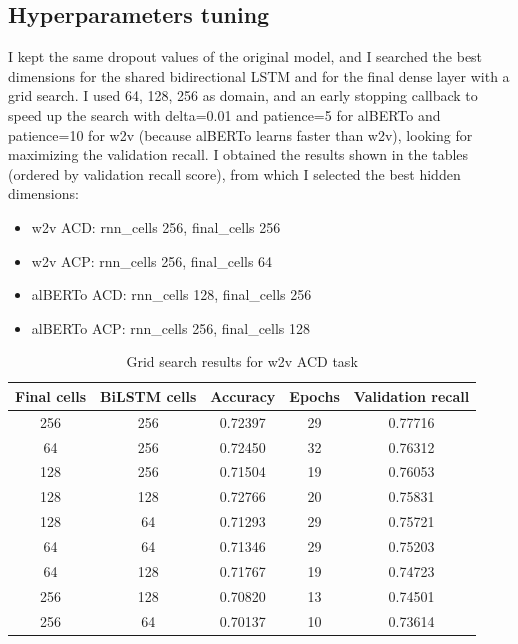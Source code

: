 \documentclass{article}
\begin{document}
        \subsection{Hyperparameters tuning}\label{subsec:hyperparameters-tuning}
            I kept the same dropout values of the original model, and I searched the best dimensions for the shared bidirectional LSTM and for the final dense layer with a grid search.
            I used {64, 128, 256} as domain, and an early stopping callback to speed up the search with delta=0.01 and patience=5 for alBERTo and patience=10 for w2v (because alBERTo learns faster than w2v), looking for maximizing the validation recall.
            I obtained the results shown in the tables (ordered by validation recall score), from which I selected the best hidden dimensions:
            \begin{itemize}
                \item w2v ACD: rnn\_cells 256, final\_cells 256
                \item w2v ACP: rnn\_cells 256, final\_cells 64
                \item alBERTo ACD: rnn\_cells 128, final\_cells 256
                \item alBERTo ACP: rnn\_cells 256, final\_cells 128
            \end{itemize}
                \begin{table}[h!]
                \begin{center}
                \caption{Grid search results for w2v ACD task}
                \label{tab:table6}
                \begin{tabular}{c|c|c|c|c}
                    \textbf{Final cells} & \textbf{BiLSTM cells} & \textbf{Accuracy} & \textbf{Epochs} & \textbf{Validation recall}\\
                    \hline
                        256 & 256 & 0.72397 & 29 & 0.77716\\
                        64  & 256 & 0.72450 & 32 & 0.76312\\
                        128 & 256 & 0.71504 & 19 & 0.76053\\
                        128 & 128 & 0.72766 & 20 & 0.75831\\
                        128 & 64  & 0.71293 & 29 & 0.75721\\
                        64  & 64  & 0.71346 & 29 & 0.75203\\
                        64  & 128 & 0.71767 & 19 & 0.74723\\
                        256 & 128 & 0.70820 & 13 & 0.74501\\
                        256 & 64  & 0.70137 & 10 & 0.73614\\
                \end{tabular}
                \end{center}
            \end{table}
\end{document}
